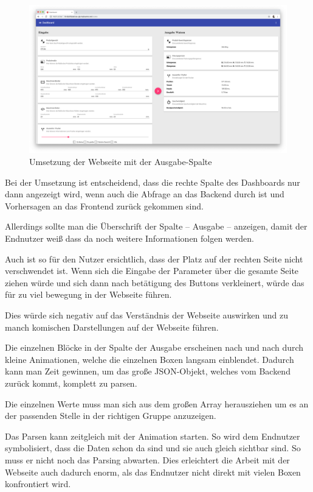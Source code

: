 \begin{figure}[h]
    \centering
    \includegraphics[width=\textwidth]{images/kapitel_4/website_output.png}
    \caption{Umsetzung der Webseite mit der Ausgabe-Spalte}
    \label{fig:umsetzung_website_output}
\end{figure}

Bei der Umsetzung ist entscheidend, dass die rechte Spalte des Dashboards nur dann angezeigt wird, wenn auch die Abfrage
an das Backend durch ist und Vorhersagen an das Frontend zurück gekommen sind.

Allerdings sollte man die Überschrift der Spalte -- Ausgabe -- anzeigen, damit der Endnutzer weiß dass da noch weitere
Informationen folgen werden.

Auch ist so für den Nutzer ersichtlich, dass der Platz auf der rechten Seite nicht verschwendet ist. Wenn sich die
Eingabe der Parameter über die gesamte Seite ziehen würde und sich dann nach betätigung des Buttons verkleinert, würde
das für zu viel bewegung in der Webseite führen.

Dies würde sich negativ auf das Verständnis der Webseite auswirken und zu manch komischen Darstellungen auf der Webseite
führen.

Die einzelnen Blöcke in der Spalte der Ausgabe erscheinen nach und nach durch kleine Animationen, welche die einzelnen
Boxen langsam einblendet. Dadurch kann man Zeit gewinnen, um das große JSON-Objekt, welches vom Backend zurück kommt,
komplett zu parsen.

Die einzelnen Werte muss man sich aus dem großen Array herausziehen um es an der passenden Stelle in der richtigen
Gruppe anzuzeigen.

Das Parsen kann zeitgleich mit der Animation starten. So wird dem Endnutzer symbolisiert, dass die Daten schon da sind
und sie auch gleich sichtbar sind. So muss er nicht noch das Parsing abwarten. Dies erleichtert die Arbeit mit der
Webseite auch dadurch enorm, als das Endnutzer nicht direkt mit vielen Boxen konfrontiert wird.

